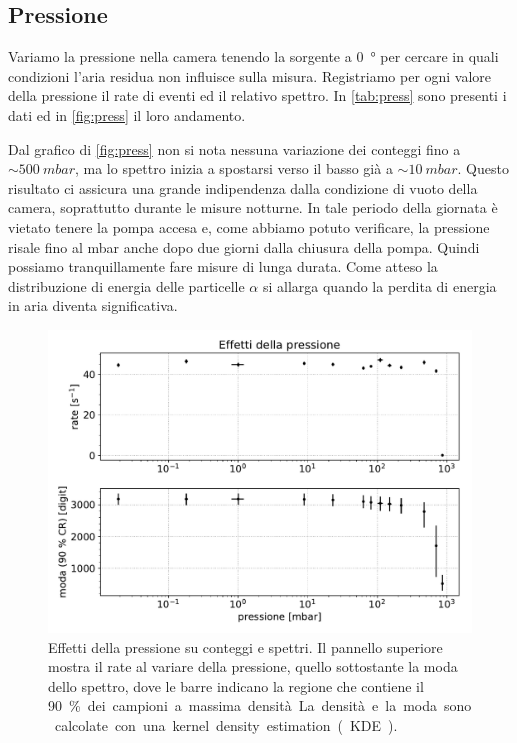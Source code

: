 \subsection{Pressione}

Variamo la pressione nella camera tenendo la sorgente a \SI{0}{\degree} per cercare in quali condizioni l'aria residua non influisce sulla misura.
Registriamo per ogni valore della pressione il rate di eventi ed il relativo spettro. In \autoref{tab:press} sono presenti i dati ed in \autoref{fig:press} il loro andamento.

Dal grafico di \autoref{fig:press} non si nota nessuna variazione dei conteggi fino a $\sim\SI{500}{mbar}$,
ma lo spettro inizia a spostarsi verso il basso già a $\sim\SI{10}{mbar}$.
Questo risultato ci assicura una grande indipendenza dalla condizione di vuoto della camera, soprattutto durante le misure notturne. In tale periodo della giornata è vietato tenere la pompa accesa e, come abbiamo potuto verificare, la pressione risale fino al mbar anche dopo due giorni dalla chiusura della pompa. Quindi possiamo tranquillamente fare misure di lunga durata.
Come atteso la distribuzione di energia delle particelle $\alpha$ si allarga
quando la perdita di energia in aria diventa significativa.

\begin{figure}
\centering
\includegraphics[width=\textwidth]{immagini/press}
\caption{Effetti della pressione su conteggi e spettri.
Il pannello superiore mostra il rate al variare della pressione,
quello sottostante la moda dello spettro,
dove le barre indicano la regione che contiene il \SI{90}\% dei campioni a massima densità.
La densità e la moda sono calcolate con una kernel density estimation (KDE).}
\label{fig:press}
\end{figure}
